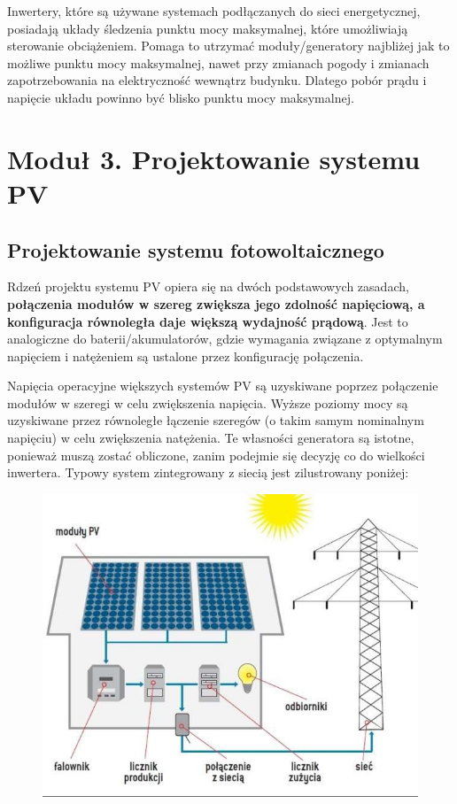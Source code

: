 \documentclass[12pt,a4paper]{article}
\begin{document}
Inwertery, które są używane systemach podłączanych do sieci 
energetycznej, posiadają układy śledzenia punktu mocy maksymalnej, które 
umożliwiają sterowanie obciążeniem. Pomaga to utrzymać moduły/generatory 
najbliżej jak to możliwe punktu mocy maksymalnej, nawet przy zmianach 
pogody i zmianach zapotrzebowania na elektryczność wewnątrz budynku. 
Dlatego pobór prądu i napięcie układu powinno być blisko punktu mocy 
maksymalnej. 
\section{Moduł 3. Projektowanie systemu PV }

\subsection{Projektowanie systemu fotowoltaicznego}

Rdzeń projektu systemu PV opiera się na dwóch podstawowych zasadach, 
\textbf{połączenia modułów w szereg zwiększa jego zdolność napięciową, a 
konfiguracja równoległa daje większą wydajność prądową}. Jest to 
analogiczne do baterii/akumulatorów, gdzie wymagania związane z 
optymalnym napięciem i natężeniem są ustalone przez konfigurację 
połączenia. 

Napięcia operacyjne większych systemów PV są uzyskiwane poprzez 
połączenie modułów w szeregi w celu zwiększenia napięcia. Wyższe poziomy 
mocy są uzyskiwane przez równoległe łączenie szeregów (o takim samym 
nominalnym napięciu) w celu zwiększenia natężenia. Te własności 
generatora są istotne, ponieważ muszą zostać obliczone, zanim podejmie 
się decyzję co do wielkości inwertera. Typowy system zintegrowany z 
siecią jest zilustrowany poniżej: 

\begin{figure}[h]
\centering
\includegraphics[natwidth=15.90cm,natheight=12.83cm]{media/image11.jpg}
\end{figure}
\end{document}
